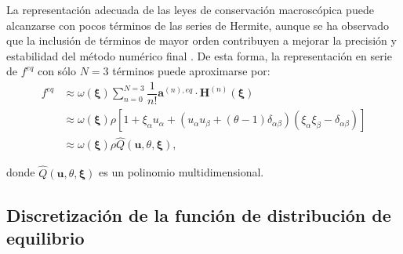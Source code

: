 La representaci\'on adecuada de las leyes de conservaci\'on macrosc\'opica puede alcanzarse con pocos t\'erminos de las series de Hermite, aunque se ha observado que la inclusi\'on de t\'erminos de mayor orden contribuyen a mejorar la precisi\'on y estabilidad del m\'etodo num\'erico final \cite{dhumieres_multiple-relaxation-time_2002}. De esta forma, la representaci\'on en serie de $f^{eq}$ con s\'olo $N=3$ t\'erminos puede aproximarse por:
\begin{equation}
\begin{aligned}
	f^{eq} &\approx \omega(\bm{\xi}) \sum_{n=0}^{N=3} \dfrac{1}{n!}\bm{a}^{(n),eq} \cdot \bm{H}^{(n)}(\bm{\xi}) \\
	&\approx \omega(\bm{\xi}) \rho \left[ 1 + \xi_{\alpha}u_{\alpha} + \left( u_{\alpha}u_{\beta}+(\theta-1)\delta_{\alpha\beta} \right)\left(\xi_{\alpha}\xi_{\beta} - \delta_{\alpha\beta}\right) \right] \\
	&\approx \omega(\bm{\xi}) \rho \hat{Q}(\bm{u}, \theta, \bm{\xi}),
\end{aligned}
\end{equation}

donde $\hat{Q}(\bm{u}, \theta, \bm{\xi})$ es un polinomio multidimensional.



\subsection{Discretizaci\'on de la funci\'on de distribuci\'on de equilibrio}

